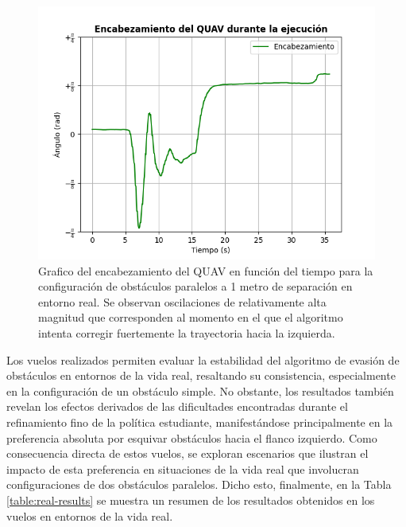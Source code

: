 \begin{figure}[H]
    \centering
    \includegraphics[scale=0.8]{partes/img/real-4-parallelC-3-yaw.png}
    \caption[Grafico del encabezamiento del QUAV en función del tiempo para la configuración de obstáculos paralelos a 1 metro de separación en entorno real.]{Grafico del encabezamiento del QUAV en función del tiempo para la configuración de obstáculos paralelos a 1 metro de separación en entorno real. Se observan oscilaciones de relativamente alta magnitud que corresponden al momento en el que el algoritmo intenta corregir fuertemente la trayectoria hacia la izquierda.}
    \label{real-4-parallelC-3-yaw}
\end{figure}

Los vuelos realizados permiten evaluar la estabilidad del algoritmo de evasión de obstáculos en entornos de la vida real, resaltando su consistencia, especialmente en la configuración de un obstáculo simple. No obstante, los resultados también revelan los efectos derivados de las dificultades encontradas durante el refinamiento fino de la política estudiante, manifestándose principalmente en la preferencia absoluta por esquivar obstáculos hacia el flanco izquierdo. Como consecuencia directa de estos vuelos, se exploran escenarios que ilustran el impacto de esta preferencia en situaciones de la vida real que involucran configuraciones de dos obstáculos paralelos. Dicho esto, finalmente, en la Tabla \ref{table:real-results} se muestra un resumen de los resultados obtenidos en los vuelos en entornos de la vida real.

